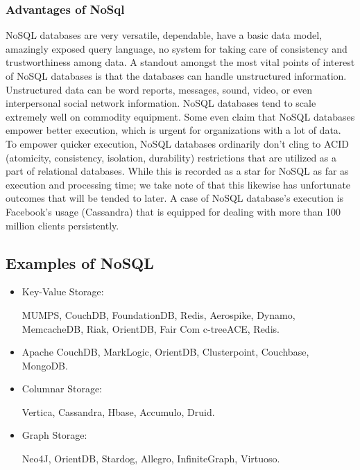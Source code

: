 \subsubsection{Advantages of NoSql}
NoSQL databases are very versatile, dependable, have a basic data model, amazingly exposed query language, no system for taking care of consistency and trustworthiness among data. A standout amongst the most vital points of interest of NoSQL databases is that the databases can handle unstructured information. Unstructured data can be word reports, messages, sound, video, or even interpersonal social network information. NoSQL databases tend to scale extremely well on commodity equipment. Some even claim that NoSQL databases empower better execution, which is urgent for organizations with a lot of data. To empower quicker execution, NoSQL databases ordinarily don't cling to ACID (atomicity, consistency, isolation, durability) restrictions that are utilized as a part of relational databases. While this is recorded as a star for NoSQL as far as execution and processing time; we take note of that this likewise has unfortunate outcomes that will be tended to later. A case of NoSQL database's execution is Facebook's usage (Cassandra) that is equipped for dealing with more than 100 million clients persistently. \cite{AdvantagesnoSql}

\subsection{Examples of NoSQL}
\begin{itemize}
\item Key-Value Storage: \par
MUMPS, CouchDB, FoundationDB, Redis, Aerospike, Dynamo, MemcacheDB, Riak, OrientDB, Fair Com c-treeACE, Redis.

\item Apache CouchDB, MarkLogic, OrientDB, Clusterpoint, Couchbase, MongoDB.

\item Columnar Storage:  \par
Vertica, Cassandra, Hbase, Accumulo, Druid.

\item Graph Storage:  \par
Neo4J, OrientDB, Stardog, Allegro, InfiniteGraph, Virtuoso. 
\end{itemize}


